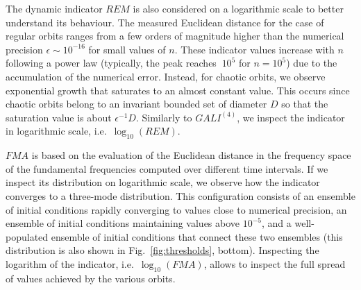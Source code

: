 \begin{chapterappendices}
The dynamic indicator $REM$ is also considered on a logarithmic scale to better understand its behaviour. The measured Euclidean distance for the case of regular orbits ranges from a few orders of magnitude higher than the numerical precision $\epsilon\sim 10^{-16}$ for small values of $n$. These indicator values increase with $n$ following a power law (typically, the peak reaches $~10^{5}$ for $n=10^5$) due to the accumulation of the numerical error. Instead, for chaotic orbits, we observe exponential growth that saturates to an almost constant value. This occurs since chaotic orbits belong to an invariant bounded set of diameter $D$ so that the saturation value is about $\epsilon^{-1} D$. %
Similarly to $GALI^{(4)}$, we inspect the indicator in logarithmic scale, i.e.~$\log_{10}(REM)$. 

$FMA$ is based on the evaluation of the Euclidean distance in the frequency space of the fundamental frequencies computed over different time intervals. If we inspect its distribution on logarithmic scale, we observe how the indicator converges to a three-mode distribution. This configuration consists of an ensemble of initial conditions rapidly converging to values close to numerical precision, an ensemble of initial conditions maintaining values above $10^{-5}$, and a well-populated ensemble of initial conditions that connect these two ensembles (this distribution is also shown in Fig.~\ref{fig:thresholds}, bottom). Inspecting the logarithm of the indicator, i.e.~$\log_{10}(FMA)$, allows to inspect the full spread of values achieved by the various orbits.

\end{chapterappendices}